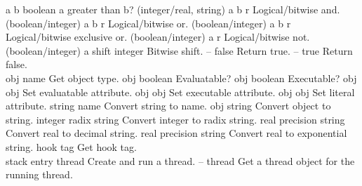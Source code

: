 \begin{longtable}{}
\hline
\optableent
	{a b}
	{{\bf {}}}
	{boolean}
	{a greater than b? (integer/real, string)}
\hline
\optableent
	{a b}
	{{\bf {}}}
	{r}
	{Logical/bitwise and. (boolean/integer) }
\hline
\optableent
	{a b}
	{{\bf {}}}
	{r}
	{Logical/bitwise or. (boolean/integer)}
\hline
\optableent
	{a b}
	{{\bf {}}}
	{r}
	{Logical/bitwise exclusive or. (boolean/integer)}
\hline
\optableent
	{a}
	{{\bf {}}}
	{r}
	{Logical/bitwise not. (boolean/integer)}
\hline
\optableent
	{a shift}
	{{\bf {}}}
	{integer}
	{Bitwise shift.}
\hline
\optableent
	{--}
	{{\bf {}}}
	{false}
	{Return true.}
\hline
\optableent
	{--}
	{{\bf {}}}
	{true}
	{Return false.}
\hline \hline
{} \\
\hline \hline
\optableent
	{obj}
	{{\bf {}}}
	{name}
	{Get object type.}
\hline
\optableent
	{obj}
	{{\bf {}}}
	{boolean}
	{Evaluatable?}
\hline
\optableent
	{obj}
	{{\bf {}}}
	{boolean}
	{Executable?}
\hline
\optableent
	{obj}
	{{\bf {}}}
	{obj}
	{Set evaluatable attribute.}
\hline
\optableent
	{obj}
	{{\bf {}}}
	{obj}
	{Set executable attribute.}
\hline
\optableent
	{obj}
	{{\bf {}}}
	{obj}
	{Set literal attribute.}
\hline
\optableent
	{string}
	{{\bf {}}}
	{name}
	{Convert string to name.}
\hline
\optableent
	{obj}
	{{\bf {}}}
	{string}
	{Convert object to string.}
\hline
\optableent
	{integer radix}
	{{\bf {}}}
	{string}
	{Convert integer to radix string.}
\hline
\optableent
	{real precision}
	{{\bf {}}}
	{string}
	{Convert real to decimal string.}
\hline
\optableent
	{real precision}
	{{\bf {}}}
	{string}
	{Convert real to exponential string.}
\hline
\optableent
	{hook}
	{{\bf {}}}
	{tag}
	{Get hook tag.}
\hline \hline
{} \\
\hline \hline
\optableent
	{stack entry}
	{{\bf {}}}
	{thread}
	{Create and run a thread.}
\hline
\optableent
	{--}
	{{\bf {}}}
	{thread}
	{Get a thread object for the running thread.}

\end{longtable}
